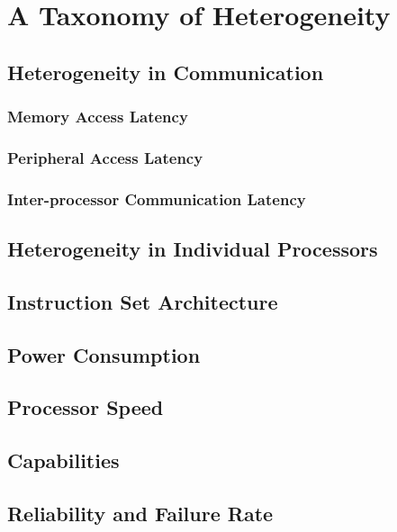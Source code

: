 \section{A Taxonomy of Heterogeneity}

\subsection{Heterogeneity in Communication}

\subsubsection{Memory Access Latency}
\subsubsection{Peripheral Access Latency}
\subsubsection{Inter-processor Communication Latency}

\subsection{Heterogeneity in Individual Processors}

\subsection{Instruction Set Architecture}
\subsection{Power Consumption}
\subsection{Processor Speed}
\subsection{Capabilities}
\subsection{Reliability and Failure Rate}
